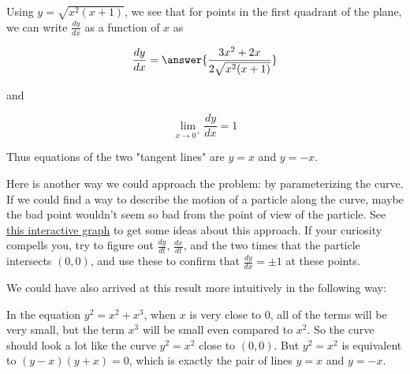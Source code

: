 \documentclass{ximera}
\begin{document}
\begin{exercise}
Using $y = \sqrt{x^2(x+1)}$, we see that for points in the first quadrant of the plane, we can write $\frac{dy}{dx}$ as a function of $x$ as

$$
\frac{dy}{dx} = \answer{\frac{3x^2+2x}{2\sqrt{x^2(x+1)}}}
$$

and

$$
\lim_{x \to 0^+} \frac{dy}{dx} = 1
$$

Thus equations of the two "tangent lines" are $y=x$ and $y=-x$.

Here is another way we could approach the problem:  by parameterizing the curve.  If we could find a way to describe the motion of a particle along the curve, maybe the bad point wouldn't seem so bad from the point of view of the particle. See \href{https://www.desmos.com/calculator/py0camtwlg}{this interactive graph} to get some ideas about this approach.  If your curiosity compells you, try to figure out $\frac{dy}{dt}$, $\frac{dx}{dt}$, and the two times that the particle intersects $(0,0)$, and use these to confirm that $\frac{dy}{dx} = \pm 1$ at these points.

We could have also arrived at this result more intuitively in the following way:

In the equation $y^2 = x^2+x^3$, when $x$ is very close to $0$, all of the terms will be very small, but the term $x^3$ will be small even compared to $x^2$.  So the curve should look a lot like the curve $y^2 = x^2$ close to $(0,0)$.  But $y^2 = x^2$ is equivalent to $(y-x)(y+x)=0$, which is exactly the pair of lines $y=x$ and $y=-x$.
\end{exercise}
\end{document}
